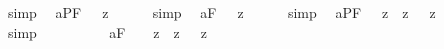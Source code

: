 \begin{isabellebody}
\ simp\ \isamarkupfalse%
%
\endisatagproof
{\isafoldproof}%
%
\isadelimproof
%
\endisadelimproof
\isanewline
{}\isamarkupfalse%
\ a{}{}{\isacharunderscore}{}{\isacharunderscore}PF{\isacharcolon}\ {\isachardoublequoteopen}{\isacharbrackleft}{\isasymA}\ {\isacharcomma}{\isasymphi}{\isacharcomma}\ {\isasymequiv}\isactrlsup z\ {\isasymA}\ {\isacharparenleft}{\isasymA}\ {\isacharcomma}{\isasymphi}{\isacharcomma}{\isacharparenright}{\isacharbrackright}{\isachardoublequoteclose}%
\isadelimproof
\ %
\endisadelimproof
%
\isatagproof
{}\isamarkupfalse%
\ simp\ \isamarkupfalse%
%
\endisatagproof
{\isafoldproof}%
%
\isadelimproof
%
\endisadelimproof
\isanewline
{}\isamarkupfalse%
\ a{}{}{\isacharunderscore}{}{\isacharunderscore}F{\isacharcolon}\ {\isachardoublequoteopen}{\isacharbrackleft}{\isasymA}\ {\isacharsemicolon}{\isasymphi}{\isacharsemicolon}\ {\isasymequiv}\isactrlsup z\ {\isasymA}\ {\isacharparenleft}{\isasymA}\ {\isacharsemicolon}{\isasymphi}{\isacharsemicolon}{\isacharparenright}{\isacharbrackright}{\isachardoublequoteclose}%
\isadelimproof
\ %
\endisadelimproof
%
\isatagproof
{}\isamarkupfalse%
\ simp\ \isamarkupfalse%
%
\endisatagproof
{\isafoldproof}%
%
\isadelimproof
%
\endisadelimproof
%
\isamarkuptrue%
\isamarkupfalse%
\ a{}{}{\isacharunderscore}{}{\isacharunderscore}PF{\isacharcolon}\ {\isachardoublequoteopen}{\isacharbrackleft}{\isasymbox}\ {\isacharparenleft}{\isacharcomma}{\isasymphi}{\isacharcomma}\ {\isasymrightarrow}\isactrlsup z\ {\isacharcomma}{\isasymphi}{\isacharcomma}{\isacharparenright}\ {\isasymrightarrow}\isactrlsup z\ {\isacharparenleft}{\isasymbox}\ {\isacharcomma}{\isasymphi}{\isacharcomma}\ {\isasymrightarrow}\isactrlsup z\ {\isasymbox}\ {\isacharcomma}{\isasymphi}{\isacharcomma}{\isacharparenright}{\isacharbrackright}{\isachardoublequoteclose}%
\isadelimproof
\ %
\endisadelimproof
%
\isatagproof
{}\isamarkupfalse%
\ simp\ \isamarkupfalse%
%
\endisatagproof
{\isafoldproof}%
%
\isadelimproof
%
\endisadelimproof
\ \ \ \ \ \ \ \isanewline
{}\isamarkupfalse%
\ a{}{}{\isacharunderscore}{}{\isacharunderscore}F{\isacharcolon}\ \ {\isachardoublequoteopen}{\isacharbrackleft}{\isasymbox}\ {\isacharparenleft}{\isacharsemicolon}{\isasymphi}{\isacharsemicolon}\ {\isasymrightarrow}\isactrlsup z\ {\isacharsemicolon}{\isasymphi}{\isacharsemicolon}{\isacharparenright}\ {\isasymrightarrow}\isactrlsup z\ {\isacharparenleft}{\isasymbox}\ {\isacharsemicolon}{\isasymphi}{\isacharsemicolon}\ {\isasymrightarrow}\isactrlsup z\ {\isasymbox}\ {\isacharsemicolon}{\isasymphi}{\isacharsemicolon}{\isacharparenright}{\isacharbrackright}{\isachardoublequoteclose}%

\end{isabellebody}
